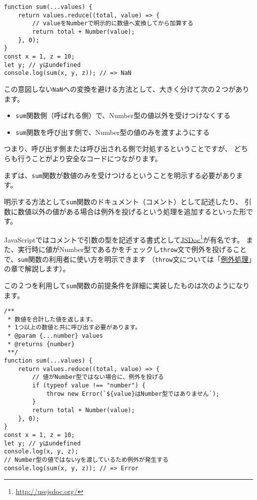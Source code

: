 \begin{lstlisting}
function sum(...values) {
    return values.reduce((total, value) => {
        // valueをNumberで明示的に数値へ変換してから加算する
        return total + Number(value);
    }, 0);
}
const x = 1, z = 10;
let y; // yはundefined
console.log(sum(x, y, z)); // => NaN
\end{lstlisting}

この意図しない\texttt{NaN}への変換を避ける方法として、大きく分けて次の２つがあります。

\begin{itemize}
\item
  \texttt{sum}関数側（呼ばれる側）で、Number型の値以外を受けつけなくする
\item
  \texttt{sum}関数を呼び出す側で、Number型の値のみを渡すようにする
\end{itemize}

つまり、呼び出す側または呼び出される側で対処するということですが、
どちらも行うことがより安全なコードにつながります。

まずは、\texttt{sum}関数が数値のみを受けつけるということを明示する必要があります。

明示する方法として\texttt{sum}関数のドキュメント（コメント）として記述したり、
引数に数値以外の値がある場合は例外を投げるという処理を追加するといった形です。

JavaScriptではコメントで引数の型を記述する書式として\href{http://usejsdoc.org/}{JSDoc}\footnote{\url{http://usejsdoc.org/}}が有名です。
また、実行時に値がNumber型であるかをチェックし\texttt{throw}文で例外を投げることで、\texttt{sum}関数の利用者に使い方を明示できます
（\texttt{throw}文については「\hyperlink{error-handling}{例外処理}」の章で解説します）。

この２つを利用して\texttt{sum}関数の前提条件を詳細に実装したものは次のようになります。

\begin{lstlisting}
/**
 * 数値を合計した値を返します。
 * 1つ以上の数値と共に呼び出す必要があります。
 * @param {...number} values
 * @returns {number}
 **/
function sum(...values) {
    return values.reduce((total, value) => {
        // 値がNumber型ではない場合に、例外を投げる
        if (typeof value !== "number") {
            throw new Error(`${value}はNumber型ではありません`);
        }
        return total + Number(value);
    }, 0);
}
const x = 1, z = 10;
let y; // yはundefined
console.log(x, y, z);
// Number型の値ではないyを渡しているため例外が発生する
console.log(sum(x, y, z)); // => Error
\end{lstlisting}

